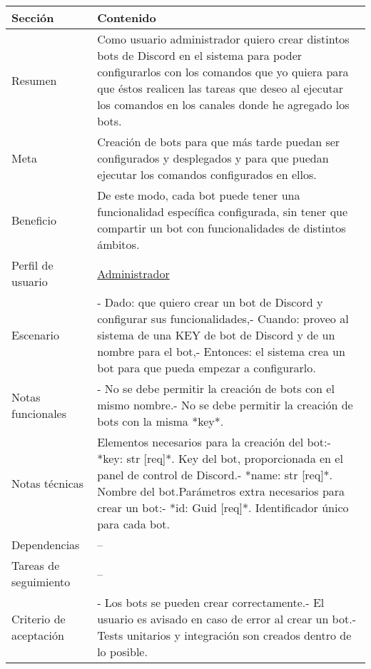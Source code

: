 \begin{table}[H]
    \centering
    \begin{adjustbox}{max width=\textwidth}
    \begin{tabularx}{\textwidth}{|l|L|}
    \hline
        Sección & Contenido \\ \hline
        Resumen & Como usuario administrador quiero crear distintos bots de Discord en el sistema para poder configurarlos con los comandos que yo quiera para que éstos realicen las tareas que deseo al ejecutar los comandos en los canales donde he agregado los bots. \\ \hline
        Meta & Creación de bots para que más tarde puedan ser configurados y desplegados y para que puedan ejecutar los comandos configurados en ellos. \\ \hline
        Beneficio & De este modo, cada bot puede tener una funcionalidad específica configurada, sin tener que compartir un bot con funcionalidades de distintos ámbitos. \\ \hline
        Perfil de usuario & \hyperref[sec:personaAdmin]{Administrador} \\ \hline
        Escenario & - Dado: que quiero crear un bot de Discord y configurar sus funcionalidades,\linebreak - Cuando: proveo al sistema de una KEY de bot de Discord y de un nombre para el bot,\linebreak - Entonces: el sistema crea un bot para que pueda empezar a configurarlo. \\ \hline
        Notas funcionales & - No se debe permitir la creación de bots con el mismo nombre.\linebreak - No se debe permitir la creación de bots con la misma *key*. \\ \hline
        Notas técnicas & Elementos necesarios para la creación del bot:\linebreak - *key: str [req]*. Key del bot, proporcionada en el panel de control de Discord.\linebreak - *name: str [req]*. Nombre del bot.\linebreak \linebreak Parámetros extra necesarios para crear un bot:\linebreak - *id: Guid [req]*. Identificador único para cada bot. \\ \hline
        Dependencias & – \\ \hline
        Tareas de seguimiento & – \\ \hline
        Criterio de aceptación & - Los bots se pueden crear correctamente.\linebreak - El usuario es avisado en caso de error al crear un bot.\linebreak - Tests unitarios y integración son creados dentro de lo posible. \\ \hline
    \end{tabularx}
    \end{adjustbox}
\end{table}


